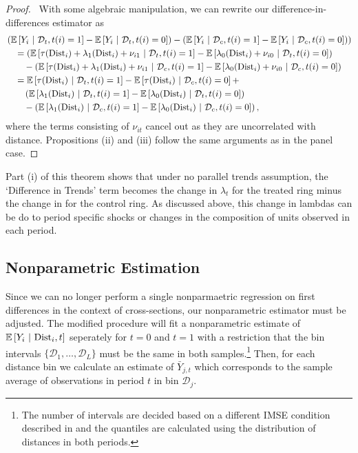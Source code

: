 \documentclass[10pt]{article}
\newcommand{\dist}{\text{Dist}}
\begin{document}
\begin{proof}
    \ With some algebraic manipulation, we can rewrite our difference-in-differences estimator as
    \begin{align*}
        &\left(\condexpec{Y_{i}}{\mathcal{D}_t, t(i) = 1} - \condexpec{Y_{i}}{\mathcal{D}_t, t(i) = 0}\right) - \left(\condexpec{Y_{i}}{\mathcal{D}_c, t(i) = 1} - \condexpec{Y_{i}}{\mathcal{D}_c, t(i) = 0})\right) \\
        &\quad = \left(\condexpec{ \tau(\dist_i) + \lambda_1(\dist_i) + \nu_{i1}}{\mathcal{D}_t, t(i) = 1} - \condexpec{\lambda_0(\dist_i) + \nu_{i0}}{\mathcal{D}_t, t(i) = 0}\right) \\
        &\quad\quad - \left(\condexpec{ \tau(\dist_i) + \lambda_1(\dist_i) + \nu_{i1}}{\mathcal{D}_c, t(i) = 1} - \condexpec{\lambda_0(\dist_i) + \nu_{i0}}{\mathcal{D}_c, t(i) = 0}\right) \\
        &\quad = \condexpec{\tau(\dist_i)}{\mathcal{D}_t, t(i) = 1} - \condexpec{\tau(\dist_i)}{\mathcal{D}_c, t(i) = 0} + \\
        &\quad\quad \left( \condexpec{\lambda_1(\dist_i)}{\mathcal{D}_t, t(i) = 1} - \condexpec{\lambda_0(\dist_i)}{\mathcal{D}_t, t(i) = 0} \right) \\
        &\quad\quad - \left( \condexpec{\lambda_1(\dist_i)}{\mathcal{D}_c, t(i) = 1} - \condexpec{\lambda_0(\dist_i)}{\mathcal{D}_c, t(i) = 0} \right),
    \end{align*}
    where the terms consisting of $\nu_{it}$ cancel out as they are uncorrelated with distance. Propositions (ii) and (iii) follow the same arguments as in the panel case.
\end{proof}

Part (i) of this theorem shows that under no parallel trends assumption, the `Difference in Trends' term becomes the change in $\lambda_t$ for the treated ring minus the change in for the control ring. As discussed above, this change in lambdas can be do to period specific shocks or changes in the composition of units observed in each period.

\subsection{Nonparametric Estimation}

Since we can no longer perform a single nonparmaetric regression on first differences in the context of cross-sections, our nonparametric estimator must be adjusted. The modified procedure will fit a nonparametric estimate of $\condexpec{Y_i}{\dist_i, t}$ seperately for $t = 0$ and $t = 1$ with a restriction that the bin intervals $\{ \mathcal{D}_1, \dots, \mathcal{D}_{L} \}$ must be the same in both samples.\footnote{The number of  intervals are decided based on a different IMSE condition described in \citet{Cattaneo_Crump_Farrell_Feng_2019} and the quantiles are calculated using the distribution of distances in both periods.} Then, for each distance bin we calculate an estimate of $\bar{Y}_{j,t}$ which corresponds to the sample average of observations in period $t$ in bin $\mathcal{D}_j$. 
\end{document}
